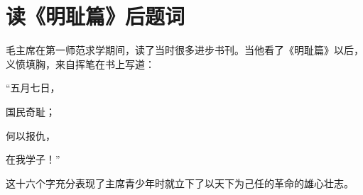 
\section[读《明耻篇》后题词（一九一五年）]{读《明耻篇》后题词}

毛主席在第一师范求学期间，读了当时很多进步书刊。当他看了《明耻篇》以后，义愤填胸，来自挥笔在书上写道：
\begin{center}
“五月七日，\par{}国民奇耻；\par{}何以报仇，\par{}  在我学子！”
\end{center}

这十六个字充分表现了主席青少年时就立下了以天下为己任的革命的雄心壮志。